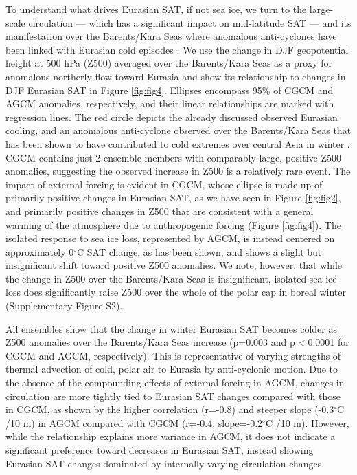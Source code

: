 \documentclass{nature}
\begin{document}
To understand what drives Eurasian SAT, if not sea ice, we turn to the large-scale circulation --- which has a significant impact on mid-latitude SAT \cite{horton15,sigmond15} --- and its manifestation over the Barents/Kara Seas where anomalous anti-cyclones have been linked with Eurasian cold episodes \cite{honda09,mori14,horton15}. We use the change in DJF geopotential height at 500 hPa (Z500) averaged over the Barents/Kara Seas as a proxy for anomalous northerly flow toward Eurasia and show its relationship to changes in DJF Eurasian SAT in Figure \ref{fig:fig4}. Ellipses encompass 95\% of CGCM and AGCM anomalies, respectively, and their linear relationships are marked with regression lines. The red circle depicts the already discussed observed Eurasian cooling, and an anomalous anti-cyclone observed over the Barents/Kara Seas that has been shown to have contributed to cold extremes over central Asia in winter \cite{horton15}. CGCM contains just 2 ensemble members with comparably large, positive Z500 anomalies, suggesting the observed increase in Z500 is a relatively rare event. The impact of external forcing is evident in CGCM, whose ellipse is made up of primarily positive changes in Eurasian SAT, as we have seen in Figure \ref{fig:fig2}, and primarily positive changes in Z500 that are consistent with a general warming of the atmosphere due to anthropogenic forcing \cite{gillett08} (Figure \ref{fig:fig4}). The isolated response to sea ice loss, represented by AGCM, is instead centered on approximately 0$^\circ$C SAT change, as has been shown, and shows a slight but insignificant shift toward positive Z500 anomalies. We note, however, that while the change in Z500 over the Barents/Kara Seas is insignificant, isolated sea ice loss does significantly raise Z500 over the whole of the polar cap in boreal winter (Supplementary Figure S2). 

All ensembles show that the change in winter Eurasian SAT becomes colder as Z500 anomalies over the Barents/Kara Seas increase (p=0.003 and p$<$0.0001 for CGCM and AGCM, respectively). This is representative of varying strengths of thermal advection of cold, polar air to Eurasia by anti-cyclonic motion. Due to the absence of the compounding effects of external forcing in AGCM, changes in circulation are more tightly tied to Eurasian SAT changes compared with those in CGCM, as shown by the higher correlation (r=-0.8) and steeper slope (-0.3$^\circ$C /10 m) in AGCM compared with CGCM (r=-0.4, slope=-0.2$^\circ$C /10 m). However, while the relationship explains more variance in AGCM, it does not indicate a significant preference toward decreases in Eurasian SAT, instead showing Eurasian SAT changes dominated by internally varying circulation changes.
\end{document}
